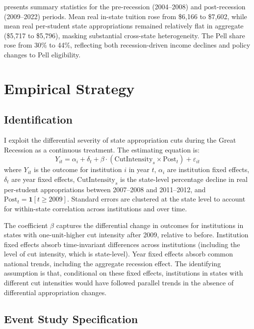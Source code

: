 \documentclass[12pt]{article}
\begin{document}


 presents summary statistics for the pre-recession (2004--2008) and post-recession (2009--2022) periods. Mean real in-state tuition rose from \$6,166 to \$7,602, while mean real per-student state appropriations remained relatively flat in aggregate (\$5,717 to \$5,796), masking substantial cross-state heterogeneity. The Pell share rose from 30\% to 44\%, reflecting both recession-driven income declines and policy changes to Pell eligibility.

\section{Empirical Strategy}

\subsection{Identification}

I exploit the differential severity of state appropriation cuts during the Great Recession as a continuous treatment. The estimating equation is:
\begin{equation}
Y_{it} = \alpha_i + \delta_t + \beta \cdot (\text{CutIntensity}_s \times \text{Post}_t) + \varepsilon_{it}
\label{eq:did}
\end{equation}
where $Y_{it}$ is the outcome for institution $i$ in year $t$, $\alpha_i$ are institution fixed effects, $\delta_t$ are year fixed effects, $\text{CutIntensity}_s$ is the state-level percentage decline in real per-student appropriations between 2007--2008 and 2011--2012, and $\text{Post}_t = \mathbf{1}[t \geq 2009]$. Standard errors are clustered at the state level to account for within-state correlation across institutions and over time.

The coefficient $\beta$ captures the differential change in outcomes for institutions in states with one-unit-higher cut intensity after 2009, relative to before. Institution fixed effects absorb time-invariant differences across institutions (including the level of cut intensity, which is state-level). Year fixed effects absorb common national trends, including the aggregate recession effect. The identifying assumption is that, conditional on these fixed effects, institutions in states with different cut intensities would have followed parallel trends in the absence of differential appropriation changes.

\subsection{Event Study Specification}
\end{document}
